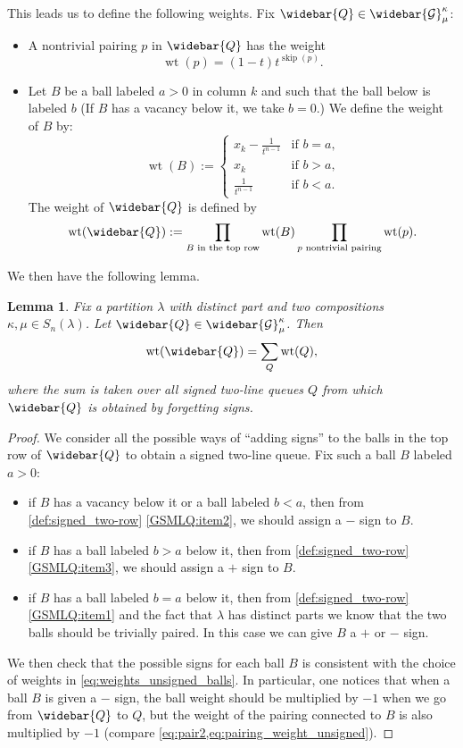 \documentclass[12pt]{amsart}
\newtheorem{lem}[thm]{Lemma}
\theoremstyle{definition}
\DeclareMathOperator{\wt}{wt}
\DeclareMathOperator{\skipped}{skip}
\newcommand{\Gbar}{\widebar{\mathcal{G}}}
\newcommand{\Qbar}{\widebar{Q}}
\begin{document}
This leads us to define the following weights. Fix $\Qbar\in \Gbar^{\kappa}_\mu$:
\begin{itemize}
    \item A nontrivial pairing $p$ in $\Qbar$ has the weight
    \begin{equation}\label{eq:pairing_weight_unsigned}
  \wt(p)=(1-t)t^{\skipped(p)}.      
    \end{equation}

    \item Let $B$ be a ball labeled $a>0$ in column $k$ and such that the ball below is labeled $b$ (If $B$ has a vacancy below it, we take $b=0$.) We define the weight of $B$ by:
\begin{equation}\label{eq:weights_unsigned_balls}
\wt(B):=
\begin{cases}
    x_k-\frac{1}{t^{n-1}}&\text{if $b=a$,}\\
    x_k&\text{if $b>a$,}\\
    \frac{1}{t^{n-1}}&\text{if $b<a$}.
\end{cases}    
\end{equation}    
The weight of $\Qbar$ is defined by
$$\wt(\Qbar):=\prod_{B \text{ in the top row}}\wt(B) \prod_{p \text{ nontrivial pairing}}\wt(p).$$
\end{itemize}
 We then have the following lemma.


 
 \begin{lem}\label{lem:forget_signs}
 Fix a partition $\lambda$ with distinct part and two compositions $\kappa,\mu\in S_n(\lambda)$. Let $\Qbar\in \Gbar^{\kappa}_\mu$. Then
 $$\wt(\Qbar)=\sum_{Q}\wt(Q),$$
where the sum is taken over all signed two-line queues $Q$ from which $\Qbar$ is obtained by forgetting signs.
 \end{lem}
\begin{proof}
    We consider all the possible ways of ``adding signs'' to the balls in the top row of $\Qbar$ to obtain a signed two-line queue. Fix such a ball $B$ labeled $a>0$:
    \begin{itemize}
        \item if $B$ has a vacancy below it or a ball labeled $b<a$, then from \cref{def:signed_two-row} \cref{GSMLQ:item2}, we should assign a $-$ sign to $B$. 
        \item if $B$ has a ball labeled $b>a$ below it, then from \cref{def:signed_two-row} \cref{GSMLQ:item3}, we should assign a $+$ sign to $B$.
        \item if $B$ has a ball labeled $b=a$ below it, then from \cref{def:signed_two-row} \cref{GSMLQ:item1} and the fact that $\lambda$ has distinct parts we know that the two balls should be trivially paired. In this case we can give $B$ a $+$ or $-$ sign.
    \end{itemize}
We then check that the possible signs for each ball $B$ is consistent with the choice of weights in \cref{eq:weights_unsigned_balls}. In particular, one notices that when a ball $B$ is given a $-$ sign, the ball weight should be multiplied by $-1$ when we go from $\Qbar$ to $Q$, but the weight of the pairing connected to $B$ is also multiplied by $-1$ (compare \cref{eq:pair2,eq:pairing_weight_unsigned}).
\end{proof}
\end{document}
